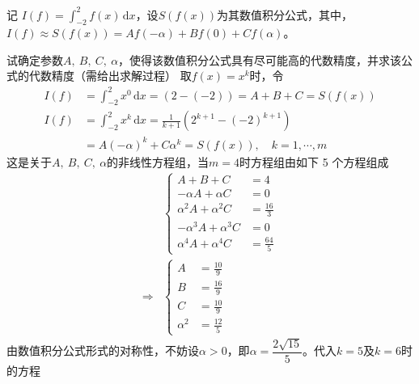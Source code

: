 \documentclass[11pt]{article}
\begin{document}
\begin{question}
    \questiontext
    {
    记 $I(f) = \displaystyle \int_{-2}^{2}\!{f(x)\,\text{d}x}$，设$S\left(f(x)\right)$为其数值积分公式，其中，$I(f) \approx S\left(f(x)\right) = Af(-\alpha) + Bf(0) + Cf(\alpha)$。
    }
    \begin{subquestion}{试确定参数$A,\ B,\ C,\ \alpha$，使得该数值积分公式具有尽可能高的代数精度，并求该公式的代数精度（需给出求解过程）}
        \answer
        {
        取$f(x) = x^k$时，令
        \begin{align*}
            I(f) & = \int_{-2}^{2}\!{x^0\,\text{d}x} = \left(2 - (-2)\right) = A + B + C = S\left(f(x)\right) \\
            I(f) & = \int_{-2}^{2}\!{x^k\,\text{d}x} = \frac{1}{k + 1}\left(2^{k + 1} - (-2)^{k + 1}\right)   \\
                 & = A(-\alpha)^k + C\alpha^k = S\left(f(x)\right),\quad k = 1,\cdots, m
        \end{align*}
        这是关于$A,\ B,\ C,\ \alpha$的非线性方程组，当$m = 4$时方程组由如下 5 个方程组成
        \begin{align*}
                        & \left\{
            \begin{aligned}
                A + B + C                & = 4            \\
                -\alpha A + \alpha C     & = 0            \\
                \alpha^2 A + \alpha^2 C  & = \frac{16}{3} \\
                -\alpha^3 A + \alpha^3 C & = 0            \\
                \alpha^4 A + \alpha^4 C  & = \frac{64}{5}
            \end{aligned}
            \right.               \\
            \Rightarrow & \left\{
            \begin{aligned}
                A        & = \frac{10}{9} \\
                B        & = \frac{16}{9} \\
                C        & = \frac{10}{9} \\
                \alpha^2 & = \frac{12}{5}
            \end{aligned}
            \right.
        \end{align*}
        由数值积分公式形式的对称性，不妨设$\alpha > 0$，即$\alpha = \dfrac{2\sqrt{15}}{5}$。代入$k = 5$及$k = 6$时的方程
        \begin{align*}

\end{align*}}
\end{subquestion}
\end{question}
\end{document}
